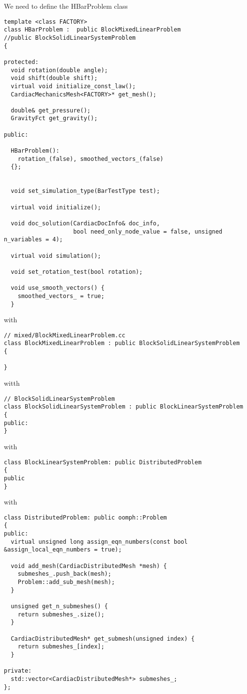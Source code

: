 We need to define the HBarProblem class
\begin{verbatim}
template <class FACTORY>
class HBarProblem :  public BlockMixedLinearProblem
//public BlockSolidLinearSystemProblem
{

protected:
  void rotation(double angle);
  void shift(double shift);
  virtual void initialize_const_law();
  CardiacMechanicsMesh<FACTORY>* get_mesh();

  double& get_pressure();
  GravityFct get_gravity();

public:

  HBarProblem():
    rotation_(false), smoothed_vectors_(false)
  {};


  void set_simulation_type(BarTestType test);

  virtual void initialize();

  void doc_solution(CardiacDocInfo& doc_info,
                    bool need_only_node_value = false, unsigned n_variables = 4);

  virtual void simulation();

  void set_rotation_test(bool rotation);

  void use_smooth_vectors() {
    smoothed_vectors_ = true;
  }
\end{verbatim}
with 
\begin{verbatim}
// mixed/BlockMixedLinearProblem.cc
class BlockMixedLinearProblem : public BlockSolidLinearSystemProblem
{

}
\end{verbatim}
witth 
\begin{verbatim}
// BlockSolidLinearSystemProblem
class BlockSolidLinearSystemProblem : public BlockLinearSystemProblem
{
public:
}
\end{verbatim}
with
\begin{verbatim}
class BlockLinearSystemProblem: public DistributedProblem
{
public
}
\end{verbatim}
with
\begin{verbatim}
class DistributedProblem: public oomph::Problem
{
public:
  virtual unsigned long assign_eqn_numbers(const bool &assign_local_eqn_numbers = true);
  
  void add_mesh(CardiacDistributedMesh *mesh) {
    submeshes_.push_back(mesh);
    Problem::add_sub_mesh(mesh);
  }

  unsigned get_n_submeshes() {
    return submeshes_.size();
  }
   
  CardiacDistributedMesh* get_submesh(unsigned index) {
    return submeshes_[index];
  }
    
private:
  std::vector<CardiacDistributedMesh*> submeshes_;
};
\end{verbatim}

